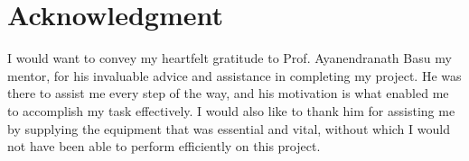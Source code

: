 \section{Acknowledgment}

I would want to convey my heartfelt gratitude to Prof. Ayanendranath Basu my mentor, for his invaluable advice and assistance in completing my project. He was there to assist me every step of the way, and his motivation is what enabled me to accomplish my task effectively. I would also like to thank him for assisting me by supplying the equipment that was essential and vital, without which I would not have been able to perform efficiently on this project.

